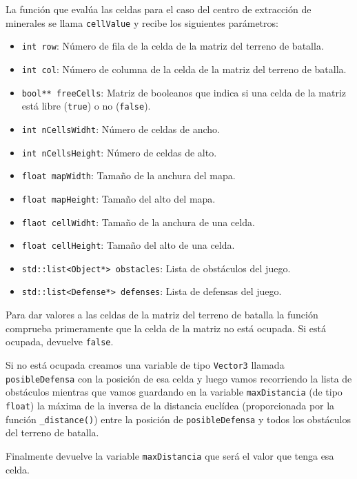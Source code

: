

La función que evalúa las celdas para el caso del centro de extracción de minerales se llama \texttt{cellValue} y recibe los siguientes parámetros:
\begin{itemize}
	\item \texttt{int row}: Número de fila de la celda de la matriz del terreno de batalla.
	\item \texttt{int col}: Número de columna de la celda de la matriz del terreno de batalla.
	\item \texttt{bool** freeCells}: Matriz de booleanos que indica si una celda de la matriz está libre (\texttt{true}) o no (\texttt{false}).
	\item \texttt{int nCellsWidht}: Número de celdas de ancho.
	\item \texttt{int nCellsHeight}: Número de celdas de alto.
	\item \texttt{float mapWidth}: Tamaño de la anchura del mapa.
	\item \texttt{float mapHeight}: Tamaño del alto del mapa.
	\item \texttt{flaot cellWidht}: Tamaño de la anchura de una celda.
	\item \texttt{float cellHeight}: Tamaño del alto de una celda.
	\item \texttt{std::list<Object*> obstacles}: Lista de obstáculos del juego.
	\item \texttt{std::list<Defense*> defenses}: Lista de defensas del juego.
\end{itemize}
Para dar valores a las celdas de la matriz del terreno de batalla la función comprueba primeramente que la celda de la matriz no está ocupada. Si está ocupada, devuelve \texttt{false}.

Si no está ocupada creamos una variable de tipo \texttt{Vector3} llamada \texttt{posibleDefensa} con la posición de esa celda y luego vamos recorriendo la lista de obstáculos mientras que vamos guardando en la variable \texttt{maxDistancia} (de tipo \texttt{float}) la máxima de la inversa de la distancia euclídea (proporcionada por la función \texttt{\_distance()}) entre la posición de \texttt{posibleDefensa} y todos los obstáculos del terreno de batalla.

Finalmente devuelve la variable \texttt{maxDistancia} que será el valor que tenga esa celda.